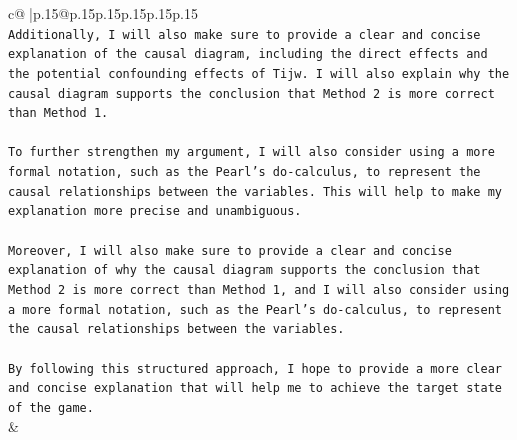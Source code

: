 \documentclass{article}
\begin{document}
{\begin{supertabular}{c@{$\;$}|p{.15\linewidth}@{}p{.15\linewidth}p{.15\linewidth}p{.15\linewidth}p{.15\linewidth}p{.15\linewidth}}
{{{\\ 
\texttt{Additionally, I will also make sure to provide a clear and concise explanation of the causal diagram, including the direct effects and the potential confounding effects of Tijw. I will also explain why the causal diagram supports the conclusion that Method 2 is more correct than Method 1.} \\
\\ 
\texttt{To further strengthen my argument, I will also consider using a more formal notation, such as the Pearl's do{-}calculus, to represent the causal relationships between the variables. This will help to make my explanation more precise and unambiguous.} \\
\\ 
\texttt{Moreover, I will also make sure to provide a clear and concise explanation of why the causal diagram supports the conclusion that Method 2 is more correct than Method 1, and I will also consider using a more formal notation, such as the Pearl's do{-}calculus, to represent the causal relationships between the variables.} \\
\\ 
\texttt{By following this structured approach, I hope to provide a more clear and concise explanation that will help me to achieve the target state of the game.} \\
            }
        }
    }
    & \\ \\

\end{supertabular}
}
\end{document}
